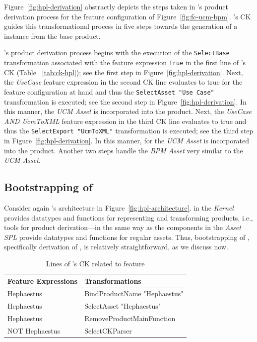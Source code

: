 
Figure~\ref{fig:hpl-derivation} abstractly depicts the steps taken in \hpl's product derivation process 
for the feature configuration of Figure~\ref{fig:fc-ucm-bpm}. \hpl{}'s CK guides this transformational process in five steps towards the generation of a \hpl{} instance from the base product.

\hpl's product derivation process begins with the execution of the \texttt{SelectBase} transformation associated with the feature expression \texttt{True} in the first line of \hpl's CK (Table ~\ref{tab:ck-hpl}); see the first step in Figure~\ref{fig:hpl-derivation}. Next, the \emph{UseCase} feature expression in the second CK line evaluates to true for the feature configuration at hand and thus the \texttt{SelectAsset "Use Case"} transformation is executed; see the second step in Figure~\ref{fig:hpl-derivation}. In this manner, the \emph{UCM Asset} is incorporated into the product. 
Next, the \emph{UseCase AND UcmToXML} feature expression in the third CK line evaluates to true and thus the \texttt{SelectExport "UcmToXML"} transformation is executed; see the third step in Figure~\ref{fig:hpl-derivation}. In this manner, \asseto{} for the \emph{UCM Asset} is incorporated into the product. Another two steps handle the \emph{BPM Asset} very similar to the \emph{UCM Asset}.


\subsection{Bootstrapping of \hpl} 
\label{sec:hpl-bootstrapping}

Consider again \hpl's architecture in Figure~\ref{fig:hpl-architecture}. \hpsplasset{} in the \emph{Kernel} provides datatypes and functions for representing and transforming \hpl{} products, i.e., tools for product derivation---in the same way as the components in the \emph{Asset SPL} provide datatypes and functions for regular assets. Thus, bootstrapping of \hpl, specifically derivation of \hpproduct, is relatively straightforward, as we discuss now.


\begin{table}[t!]
\begin{center}
\begin{tabular}{||l||l||}
  \hline
  \textbf{Feature Expressions} & \textbf{Transformations}   \\  \hline
  Hephaestus & BindProductName "Hephaestus" \\
  Hephaestus & SelectAsset "Hephaestus"   \\
  Hephaestus & RemoveProductMainFunction \\ \hline
  NOT Hephaestus & SelectCKParser \\ \hline
\end{tabular}
\caption{Lines of \hpl's CK related to \hp{} feature}
\label{tab:hplck-2}
\end{center}
\end{table}


